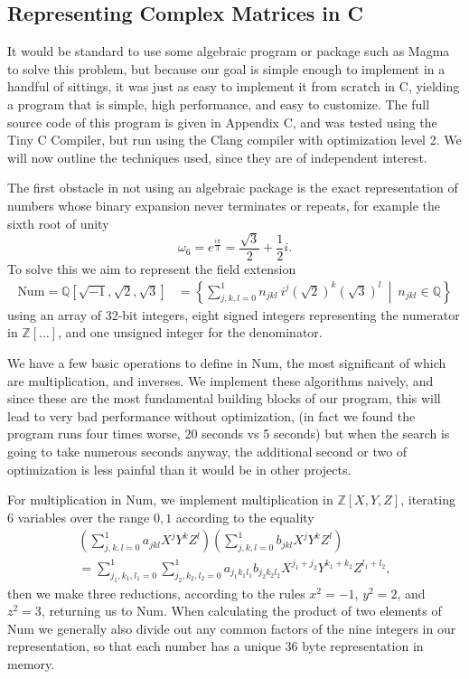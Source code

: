 \subsection{Representing Complex Matrices in C}
It would be standard to use some algebraic program or package such as Magma to solve this problem, but because our goal is simple enough to implement in a handful of sittings, it was just as easy to implement it from scratch in C, yielding a program that is simple, high performance, and easy to customize. The full source code of this program is given in Appendix C, and was tested using the Tiny C Compiler, but run using the Clang compiler with optimization level 2. We will now outline the techniques used, since they are of independent interest. 

The first obstacle in not using an algebraic package is the exact representation of numbers whose binary expansion never terminates or repeats, for example the sixth root of unity
\[\omega_6 = e^{\frac{i\pi}{3}} = \frac{\sqrt{3}}{2} + \frac{1}{2}i.\]
To solve this we aim to represent the field extension
\begin{align*}
	\text{Num} = \mathbb{Q}[\sqrt{-1}, \sqrt{2}, \sqrt{3}]
	&= \left\{ \sum_{j,k,l = 0}^1 n_{jkl}\ i^j\left(\sqrt{2}\right)^k\left(\sqrt{3}\right)^l
	\ \middle|\ n_{jkl} \in \mathbb{Q}\right\}
\end{align*}
using an array of 32-bit integers, eight signed integers representing the numerator in $\mathbb{Z}[\dots]$, and one unsigned integer for the denominator.

We have a few basic operations to define in Num, the most significant of which are multiplication, and inverses. We implement these algorithms naively, and since these are the most fundamental building blocks of our program, this will lead to very bad performance without optimization, (in fact we found the program runs four times worse, 20 seconds vs 5 seconds) but when the search is going to take numerous seconds anyway, the additional second or two of optimization is less painful than it would be in other projects.

For multiplication in Num, we implement multiplication in $\mathbb{Z}[X, Y, Z]$, iterating 6 variables over the range ${0, 1}$ according to the equality
\begin{align*}
	\left(\sum_{j,k,l = 0}^1 a_{jkl}X^jY^kZ^l\right)\left(\sum_{j,k,l = 0}^1 b_{jkl}X^jY^kZ^l\right)
	\\= \sum_{j_1,k_1,l_1=0}^1\sum_{j_2,k_2,l_2=0}^1 a_{j_1k_1l_1}b_{j_2k_2l_2}X^{j_1+j_2}Y^{k_1+k_2}Z^{l_1+l_2},
\end{align*}
then we make three reductions, according to the rules $x^2 = -1$, $y^2 = 2$, and $z^2 = 3$, returning us to Num. When calculating the product of two elements of Num we generally also divide out any common factors of the nine integers in our representation, so that each number has a unique 36 byte representation in memory.

